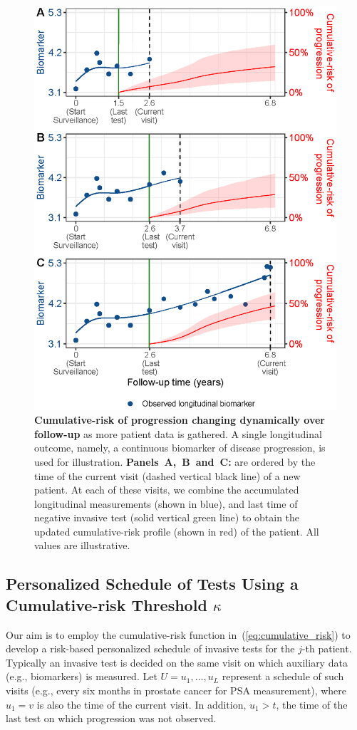 \begin{figure}
\centerline{\includegraphics{images/dynrisk_plot_102.eps}}
\caption{\textbf{Cumulative-risk of progression changing dynamically over follow-up} as more patient data is gathered. A single longitudinal outcome, namely, a continuous biomarker of disease progression, is used for illustration. \textbf{Panels~A,~B~and~C:} are ordered by the time of the current visit (dashed vertical black line) of a new patient. At each of these visits, we combine the accumulated longitudinal measurements (shown in blue), and last time of negative invasive test (solid vertical green line) to obtain the updated cumulative-risk profile (shown in red) of the patient. All values are illustrative.} 
\label{fig:dynrisk_explanation}
\end{figure}

\subsection{Personalized Schedule of Tests Using a Cumulative-risk Threshold $\kappa$}
\label{subsec:pers_schedule}
Our aim is to employ the cumulative-risk function in~(\ref{eq:cumulative_risk}) to develop a risk-based personalized schedule of invasive tests for the $j$-th patient. Typically an invasive test is decided on the same visit on which auxiliary data (e.g., biomarkers) is measured. Let $U={u_1, \ldots, u_L}$ represent a schedule of such visits (e.g., every six months in prostate cancer for PSA measurement), where $u_1=v$ is also the time of the current visit. In addition, $u_1 > t$, the time of the last test on which progression was not observed. 

